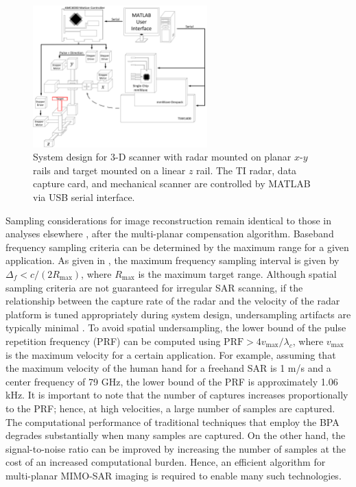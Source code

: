\documentclass{ieeeaccess}
\begin{document}
\begin{figure}[h]
    \centering
    \includegraphics[width=0.6\textwidth]{smith4.png}
    \caption{System design for \mbox{3-D} scanner with radar mounted on planar $x$-$y$ rails and target mounted on a linear $z$ rail. The TI radar, data capture card, and mechanical scanner are controlled by MATLAB via USB serial interface.}
    \label{fig:scanner_xyz}
\end{figure}

Sampling considerations for image reconstruction remain identical to those in analyses elsewhere \cite{yanik2019sparse,sheen2001three}, after the multi-planar compensation algorithm.
Baseband frequency sampling criteria can be determined by the maximum range for a given application.
As given in \cite{sheen2010near}, the maximum frequency sampling interval is given by $\Delta_f < c/(2R_\text{max})$, where $R_\text{max}$ is the maximum target range. 
Although spatial sampling criteria are not guaranteed for irregular SAR scanning, if the relationship between the capture rate of the radar and the velocity of the radar platform is tuned appropriately during system design, undersampling artifacts are typically minimal \cite{alvarez2019freehand,alvarez2021freehand,alvarez2021freehandsystem,alvarez2021system}. 
To avoid spatial undersampling, the lower bound of the pulse repetition frequency (PRF) can be computed using $\text{PRF} > 4v_\text{max}/\lambda_c$, where $v_\text{max}$ is the maximum velocity for a certain application. 
For example, assuming that the maximum velocity of the human hand for a freehand SAR is 1 m/s and a center frequency of 79 GHz, the lower bound of the PRF is approximately 1.06 kHz. 
It is important to note that the number of captures increases proportionally to the PRF; hence, at high velocities, a large number of samples are captured. 
The computational performance of traditional techniques that employ the BPA degrades substantially when many samples are captured. 
On the other hand, the signal-to-noise ratio can be improved by increasing the number of samples at the cost of an increased computational burden.
Hence, an efficient algorithm for multi-planar MIMO-SAR imaging is required to enable many such technologies. 
\end{document}
